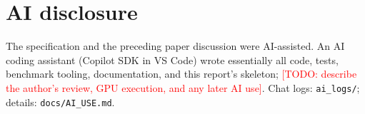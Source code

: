 \documentclass[10pt]{article}
\newcommand{\TODO}[1]{\textcolor{red}{[TODO: #1]}}
\begin{document}
\section{AI disclosure}
The specification and the preceding paper discussion were AI-assisted. An AI coding assistant (Copilot
SDK in VS Code) wrote essentially all code, tests, benchmark tooling, documentation, and this report's
skeleton; \TODO{describe the author's review, GPU execution, and any later AI use}. Chat logs:
\texttt{ai\_logs/}; details: \texttt{docs/AI\_USE.md}.
\end{document}
